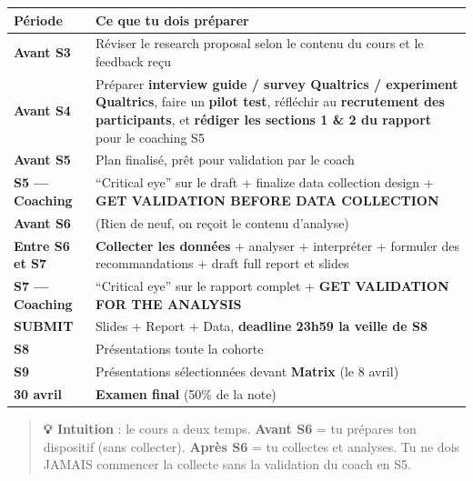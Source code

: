 \documentclass[
]{article}
\begin{document}
\begin{longtable}[]{@{}
  >{\raggedright\arraybackslash}p{}
  >{\raggedright\arraybackslash}p{}@{}}
\toprule\noalign{}
\begin{minipage}[b]{\linewidth}\raggedright
Période
\end{minipage} & \begin{minipage}[b]{\linewidth}\raggedright
Ce que tu dois préparer
\end{minipage} \\
\midrule\noalign{}
\endhead
\bottomrule\noalign{}
\endlastfoot
\textbf{Avant S3} & Réviser le research proposal selon le contenu du
cours et le feedback reçu \\
\textbf{Avant S4} & Préparer \textbf{interview guide / survey Qualtrics
/ experiment Qualtrics}, faire un \textbf{pilot test}, réfléchir au
\textbf{recrutement des participants}, et \textbf{rédiger les sections 1
\& 2 du rapport} pour le coaching S5 \\
\textbf{Avant S5} & Plan finalisé, prêt pour validation par le coach \\
\textbf{S5 --- Coaching} & ``Critical eye'' sur le draft + finalize data
collection design + \textbf{GET VALIDATION BEFORE DATA COLLECTION} \\
\textbf{Avant S6} & (Rien de neuf, on reçoit le contenu d'analyse) \\
\textbf{Entre S6 et S7} & \textbf{Collecter les données} + analyser +
interpréter + formuler des recommandations + draft full report et
slides \\
\textbf{S7 --- Coaching} & ``Critical eye'' sur le rapport complet +
\textbf{GET VALIDATION FOR THE ANALYSIS} \\
\textbf{SUBMIT} & Slides + Report + Data, \textbf{deadline 23h59 la
veille de S8} \\
\textbf{S8} & Présentations toute la cohorte \\
\textbf{S9} & Présentations sélectionnées devant \textbf{Matrix} (le 8
avril) \\
\textbf{30 avril} & \textbf{Examen final} (50\% de la note) \\
\end{longtable}

\begin{quote}
\textbf{💡 Intuition} : le cours a deux temps. \textbf{Avant S6} = tu
prépares ton dispositif (sans collecter). \textbf{Après S6} = tu
collectes et analyses. Tu ne dois JAMAIS commencer la collecte sans la
validation du coach en S5.
\end{quote}
\end{document}
